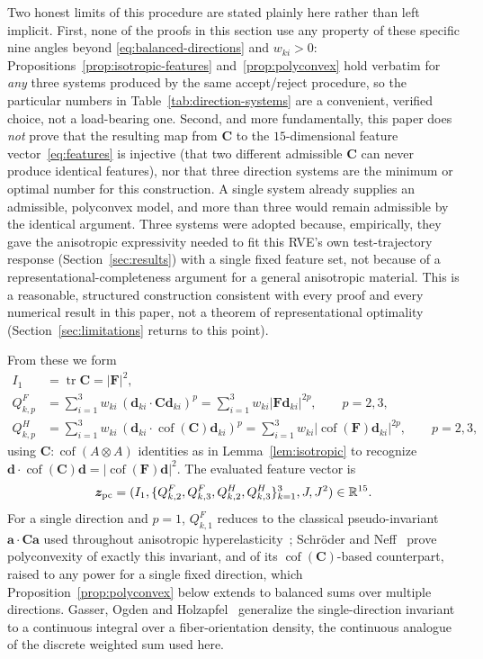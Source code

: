 \documentclass[10pt,a4paper]{article}
\newcommand{\Cof}{\operatorname{cof}}
\newcommand{\tr}{\operatorname{tr}}
\newcommand{\R}{\mathbb{R}}
\begin{document}
Two honest limits of this procedure are stated plainly here rather than
left implicit. First, none of the proofs in this section use any
property of these specific nine angles beyond
\eqref{eq:balanced-directions} and $w_{ki}>0$: Propositions~\ref{prop:isotropic-features}
and~\ref{prop:polyconvex} hold verbatim for \emph{any} three systems
produced by the same accept/reject procedure, so the particular numbers
in Table~\ref{tab:direction-systems} are a convenient, verified choice,
not a load-bearing one. Second, and more fundamentally, this paper does
\emph{not} prove that the resulting map from $\bm C$ to the
$15$-dimensional feature vector~\eqref{eq:features} is injective (that
two different admissible $\bm C$ can never produce identical features),
nor that three direction systems are the minimum or optimal number for
this construction. A single system already supplies an admissible,
polyconvex model, and more than three would remain admissible by the
identical argument. Three systems were adopted because, empirically,
they gave the anisotropic expressivity needed to fit this RVE's own
test-trajectory response (Section~\ref{sec:results}) with a single fixed
feature set, not because of a representational-completeness argument
for a general anisotropic material. This is a reasonable, structured
construction consistent with every proof and every numerical result in
this paper, not a theorem of representational optimality
(Section~\ref{sec:limitations} returns to this point).

From these we form
\begin{align}
 I_1&=\tr \bm C=|\bm F|^2,\nonumber\\
 Q_{k,p}^F&=\sum_{i=1}^3 w_{ki}\,(\bm d_{ki}\cdot \bm C\bm d_{ki})^p
       =\sum_{i=1}^3 w_{ki}|\bm F\bm d_{ki}|^{2p},\qquad p=2,3,\nonumber\\
 Q_{k,p}^H&=\sum_{i=1}^3 w_{ki}\,(\bm d_{ki}\cdot\Cof(\bm C)\bm d_{ki})^p
       =\sum_{i=1}^3 w_{ki}|\Cof(\bm F)\bm d_{ki}|^{2p},\qquad p=2,3,
 \label{eq:qfeatures}
\end{align}
using $\bm C:\Cof(A\otimes A)$ identities as in Lemma~\ref{lem:isotropic} to
recognize $\bm d\cdot\Cof(\bm C)\bm d=|\Cof(\bm F)\bm d|^2$. The evaluated feature vector is
\begin{equation}
 \bm z_{\rm pc}=(I_1,\{Q_{k,2}^F,Q_{k,3}^F,Q_{k,2}^H,Q_{k,3}^H\}_{k=1}^3,J,J^2)
 \in\R^{15}.
 \label{eq:features}
\end{equation}
For a single direction and $p=1$, $Q_{k,1}^F$ reduces to the classical
pseudo-invariant $\bm a\cdot\bm C\bm a$ used throughout anisotropic
hyperelasticity~\cite{Spencer1971,Spencer1984,Boehler1987}; Schr\"oder and
Neff~\cite{SchroderNeff2003} prove polyconvexity of exactly this
invariant, and of its $\Cof(\bm C)$-based counterpart, raised to any power
for a single fixed direction, which Proposition~\ref{prop:polyconvex}
below extends to balanced sums over multiple directions. Gasser, Ogden
and Holzapfel~\cite{Gasser2006} generalize the single-direction invariant
to a continuous integral over a fiber-orientation density, the continuous
analogue of the discrete weighted sum used here.
\end{document}
